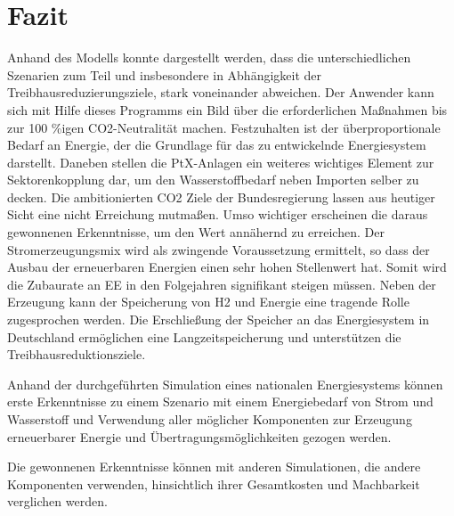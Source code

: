 \section{Fazit}
Anhand des Modells konnte dargestellt werden, dass die unterschiedlichen Szenarien zum Teil und insbesondere in Abhängigkeit der Treibhausreduzierungsziele, stark voneinander abweichen. Der Anwender kann sich mit Hilfe dieses Programms ein Bild über die erforderlichen Maßnahmen bis zur 100 \%igen CO2-Neutralität machen. 
Festzuhalten ist der überproportionale Bedarf an Energie, der die Grundlage für das zu entwickelnde Energiesystem darstellt. Daneben stellen die PtX-Anlagen ein weiteres wichtiges Element zur Sektorenkopplung dar, um den Wasserstoffbedarf neben Importen selber zu decken. 
Die ambitionierten CO2 Ziele der Bundesregierung lassen aus heutiger Sicht eine nicht Erreichung mutmaßen. Umso wichtiger erscheinen die daraus gewonnenen Erkenntnisse, um den Wert annähernd zu erreichen. Der Stromerzeugungsmix wird als zwingende Voraussetzung ermittelt, so dass der Ausbau der erneuerbaren Energien einen sehr hohen Stellenwert hat. Somit wird die Zubaurate an EE in den Folgejahren signifikant steigen müssen. 
Neben der Erzeugung kann der Speicherung von H2 und Energie eine tragende Rolle zugesprochen werden. Die Erschließung der Speicher an das Energiesystem in Deutschland ermöglichen eine Langzeitspeicherung und unterstützen die Treibhausreduktionsziele. 

\newpage
Anhand der durchgeführten Simulation eines nationalen Energiesystems können erste Erkenntnisse zu einem Szenario mit einem Energiebedarf von Strom und Wasserstoff und Verwendung aller möglicher Komponenten zur Erzeugung erneuerbarer Energie und Übertragungsmöglichkeiten gezogen werden.





Die gewonnenen Erkenntnisse können mit anderen Simulationen, die andere Komponenten verwenden, hinsichtlich ihrer Gesamtkosten und Machbarkeit verglichen werden.